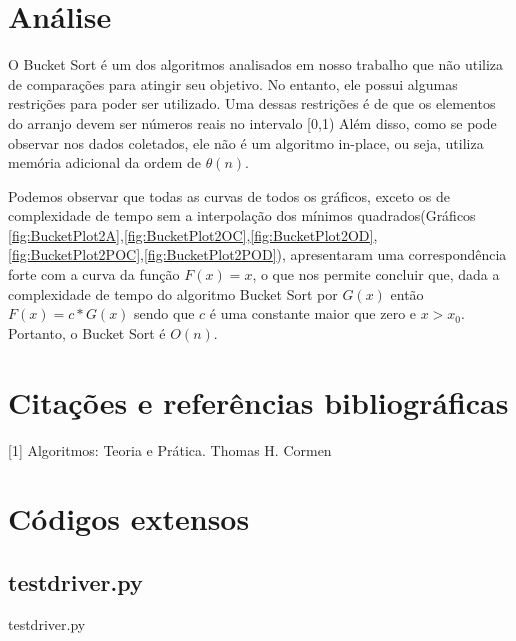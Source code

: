 \documentclass[12pt,a4paper,twoside]{report}
\begin{document}
\chapter{Análise}

O Bucket Sort é um dos algoritmos analisados em nosso trabalho que não utiliza de comparações para atingir seu objetivo. No entanto, ele possui algumas restrições para poder ser utilizado. Uma dessas restrições é de que os elementos do arranjo devem ser números reais no intervalo [0,1) Além disso, como se pode observar nos dados coletados, ele não é um algoritmo in-place, ou seja, utiliza memória adicional da ordem de $\theta (n)$.

Podemos observar que todas as curvas de todos os gráficos, exceto os de complexidade de tempo sem a interpolação dos mínimos quadrados(Gráficos \ref{fig:BucketPlot2A},\ref{fig:BucketPlot2OC},\ref{fig:BucketPlot2OD},\ref{fig:BucketPlot2POC},\ref{fig:BucketPlot2POD}), apresentaram uma correspondência forte com a curva da função $F(x) = x$, o que nos permite concluir que, dada a complexidade de tempo do algoritmo Bucket Sort por $G(x)$ então $F(x) = c * G(x)$ sendo que $c$ é uma constante maior que zero e $x > x_0$. Portanto, o Bucket Sort é $O(n)$.

\chapter{Citações e referências bibliográficas}
	[1] Algoritmos: Teoria e Prática. Thomas H. Cormen
		\date{Today}






\clearpage
{}
\appendix

\chapter{Códigos extensos \label{ap:testdriver}}
\section{testdriver.py}
 {testdriver.py}
\end{document}
